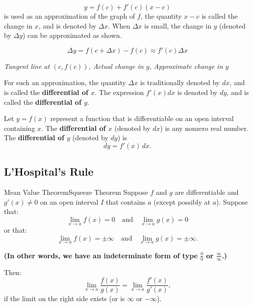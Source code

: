 \documentclass[12pt]{article}
\theoremstyle{beautifulthm}
\begin{document}

\[
y = f(c) + f'(c)(x - c)
\]
is used as an approximation of the graph of \(f\), the quantity \(x - c\) is called the change in \(x\), and is denoted by \(\Delta x\). When \(\Delta x\) is small, the change in \(y\) (denoted by \(\Delta y\)) can be approximated as shown.

\[
\Delta y = f(c + \Delta x) - f(c) \approx f'(c)\Delta x
\]

\textit{Tangent line at \((c,f(c))\), Actual change in \(y\), Approximate change in \(y\)}

For such an approximation, the quantity \(\Delta x\) is traditionally denoted by \(dx\), and is called the \textbf{differential of \(x\)}. The expression \(f'(x)dx\) is denoted by \(dy\), and is called the \textbf{differential of \(y\)}.


\begin{Definition}{}{}
Let \( y = f(x) \) represent a function that is differentiable on an open interval containing \( x \). The \textbf{differential of \( x \)} (denoted by \( dx \)) is any nonzero real number. The \textbf{differential of \( y \)} (denoted by \( dy \)) is
\[
dy = f'(x) \, dx.
\]
\end{Definition}
\newpage

\subsection{L’Hospital’s Rule}
\begin{mytheorem}{Mean Value Theorem}{Squeeze Theorem}
Suppose \( f \) and \( g \) are differentiable and \( g'(x) \neq 0 \) on an open interval \( I \) that contains \( a \) (except possibly at \( a \)). Suppose that:
\[
\lim_{x \to a} f(x) = 0 \quad \text{and} \quad \lim_{x \to a} g(x) = 0
\]
or that:
\[
\lim_{x \to a} f(x) = \pm \infty \quad \text{and} \quad \lim_{x \to a} g(x) = \pm \infty.
\]

\textbf{(In other words, we have an indeterminate form of type \( \frac{0}{0} \) or \( \frac{\infty}{\infty} \).)}

Then:
\[
\lim_{x \to a} \frac{f(x)}{g(x)} = \lim_{x \to a} \frac{f'(x)}{g'(x)},
\]
if the limit on the right side exists (or is \( \infty \) or \( -\infty \)).

\end{mytheorem}
\end{document}
